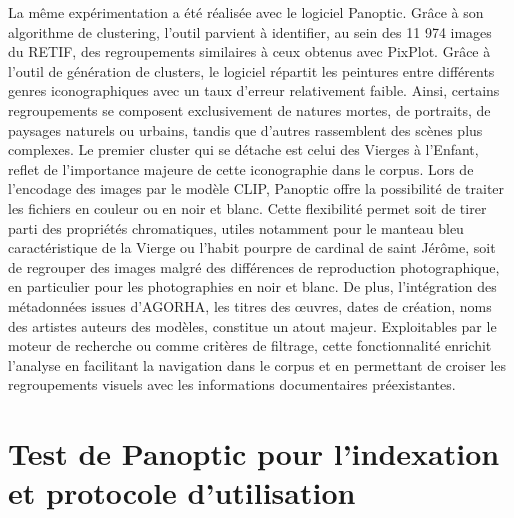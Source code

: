 La même expérimentation a été réalisée avec le logiciel Panoptic. Grâce à son algorithme de clustering, l’outil parvient à identifier, au sein des 11 974 images du RETIF, des regroupements similaires à ceux obtenus avec PixPlot. Grâce à l’outil de génération de clusters, le logiciel répartit les peintures entre différents genres iconographiques avec un taux d’erreur relativement faible. Ainsi, certains regroupements se composent exclusivement de natures mortes, de portraits, de paysages naturels ou urbains, tandis que d’autres rassemblent des scènes plus complexes. Le premier cluster qui se détache est celui des Vierges à l’Enfant, reflet de l’importance majeure de cette iconographie dans le corpus. Lors de l’encodage des images par le modèle CLIP, Panoptic offre la possibilité de traiter les fichiers en couleur ou en noir et blanc. Cette flexibilité permet soit de tirer parti des propriétés chromatiques, utiles notamment pour le manteau bleu caractéristique de la Vierge ou l’habit pourpre de cardinal de saint Jérôme, soit de regrouper des images malgré des différences de reproduction photographique, en particulier pour les photographies en noir et blanc. De plus, l’intégration des métadonnées issues d’AGORHA, les titres des œuvres, dates de création, noms des artistes auteurs des modèles, constitue un atout majeur. Exploitables par le moteur de recherche ou comme critères de filtrage, cette fonctionnalité enrichit l’analyse en facilitant la navigation dans le corpus et en permettant de croiser les regroupements visuels avec les informations documentaires préexistantes.

\section[Indexation avec Panoptic]{Test de Panoptic pour l’indexation et protocole d’utilisation}
 
